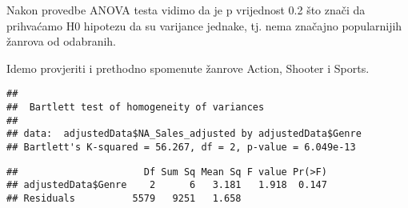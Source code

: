 \documentclass[
]{article}
\newenvironment{Shaded}{\begin{snugshade}}{\end{snugshade}}
\newcommand{\CommentTok}[1]{\textcolor[rgb]{0.56,0.35,0.01}{\textit{#1}}}
\newcommand{\DecValTok}[1]{\textcolor[rgb]{0.00,0.00,0.81}{#1}}
\newcommand{\FunctionTok}[1]{\textcolor[rgb]{0.00,0.00,0.00}{#1}}
\newcommand{\NormalTok}[1]{#1}
\newcommand{\OtherTok}[1]{\textcolor[rgb]{0.56,0.35,0.01}{#1}}
\newcommand{\SpecialCharTok}[1]{\textcolor[rgb]{0.00,0.00,0.00}{#1}}
\newcommand{\StringTok}[1]{\textcolor[rgb]{0.31,0.60,0.02}{#1}}
\begin{document}
Nakon provedbe ANOVA testa vidimo da je p vrijednost 0.2 što znači da
prihvaćamo H0 hipotezu da su varijance jednake, tj. nema značajno
popularnijih žanrova od odabranih.

Idemo provjeriti i prethodno spomenute žanrove Action, Shooter i Sports.

\begin{Shaded}
\end{Shaded}

\begin{verbatim}
## 
##  Bartlett test of homogeneity of variances
## 
## data:  adjustedData$NA_Sales_adjusted by adjustedData$Genre
## Bartlett's K-squared = 56.267, df = 2, p-value = 6.049e-13
\end{verbatim}

\begin{Shaded}
\end{Shaded}

\begin{verbatim}
##                      Df Sum Sq Mean Sq F value Pr(>F)
## adjustedData$Genre    2      6   3.181   1.918  0.147
## Residuals          5579   9251   1.658
\end{verbatim}
\end{document}
